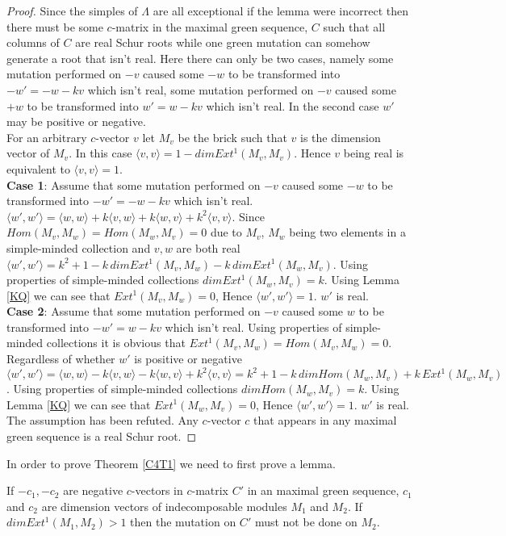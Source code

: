 \begin{proof}
\indent Since the simples of $\Lambda$ are all exceptional if the lemma were incorrect then there must be some $c$-matrix in the maximal green sequence, $C$ such that all columns of $C$ are real Schur roots while one green mutation can somehow generate a root that isn't real. Here there can only be two cases, namely some mutation performed on $-v$ caused some $-w$ to be transformed into $-w'=-w-kv$ which isn't real, some mutation performed on $-v$ caused some $+w$ to be transformed into $w'=w-kv$ which isn't real. In the second case $w'$ may be positive or negative.\\
\indent For an arbitrary $c$-vector $v$ let $M_v$ be the brick such that $v$ is the dimension vector of $M_v$. In this case $\langle v,v\rangle=1-dim Ext^1(M_v,M_v)$. Hence $v$ being real is equivalent to $\langle v,v\rangle=1$.\\
\indent \textbf{Case 1}: Assume that some mutation performed on $-v$ caused some $-w$ to be transformed into $-w'=-w-kv$ which isn't real. $\langle w', w'\rangle = \langle w, w\rangle + k\langle v,w\rangle + k\langle w,v\rangle + k^2\langle v,v\rangle$. Since $Hom(M_v, M_w) = Hom(M_w, M_v) = 0$ due to $M_v$, $M_w$ being two elements in a simple-minded collection and $v, w$ are both real  $\langle w', w'\rangle = k^2+1-k\, dim Ext^1(M_v, M_w) - k\, dim Ext^1(M_w, M_v)$. Using properties of simple-minded collections $dim Ext^1(M_w, M_v)  = k$. Using Lemma \ref{KQ} we can see that $Ext^1(M_v, M_w)  = 0$, Hence $\langle w', w'\rangle = 1$. $w'$ is real.\\
\indent \textbf{Case 2}: Assume that some mutation performed on $-v$ caused some $w$ to be transformed into $-w'=w-kv$ which isn't real. Using properties of simple-minded collections it is obvious that $Ext^1(M_v, M_w) = Hom(M_v, M_w) = 0$. Regardless of whether $w'$ is positive or negative $\langle w', w'\rangle = \langle w, w\rangle - k\langle v,w\rangle - k\langle w,v\rangle + k^2\langle v,v\rangle = k^2+1 -k\,dim Hom(M_w, M_v) + k\,Ext^1(M_w, M_v)$. Using properties of simple-minded collections $dim Hom(M_w, M_v)  = k$. Using Lemma \ref{KQ} we can see that $Ext^1(M_w, M_v)  = 0$, Hence $\langle w', w'\rangle = 1$. $w'$ is real.\\
\indent The assumption has been refuted. Any $c$-vector $c$ that appears in any maximal green sequence is a real Schur root.
\end{proof}
\indent In order to prove Theorem \ref{C4T1} we need to first prove a lemma.
\begin{lemma}\label{C4L}
\indent If $-c_1, -c_2$ are negative $c$-vectors in $c$-matrix $C'$ in an maximal green sequence, $c_1$ and $c_2$ are dimension vectors of indecomposable modules $M_1$ and $M_2$. If $dim Ext^1(M_1, M_2) > 1$ then the mutation on $C'$ must not be done on $M_2$.
\end{lemma}

